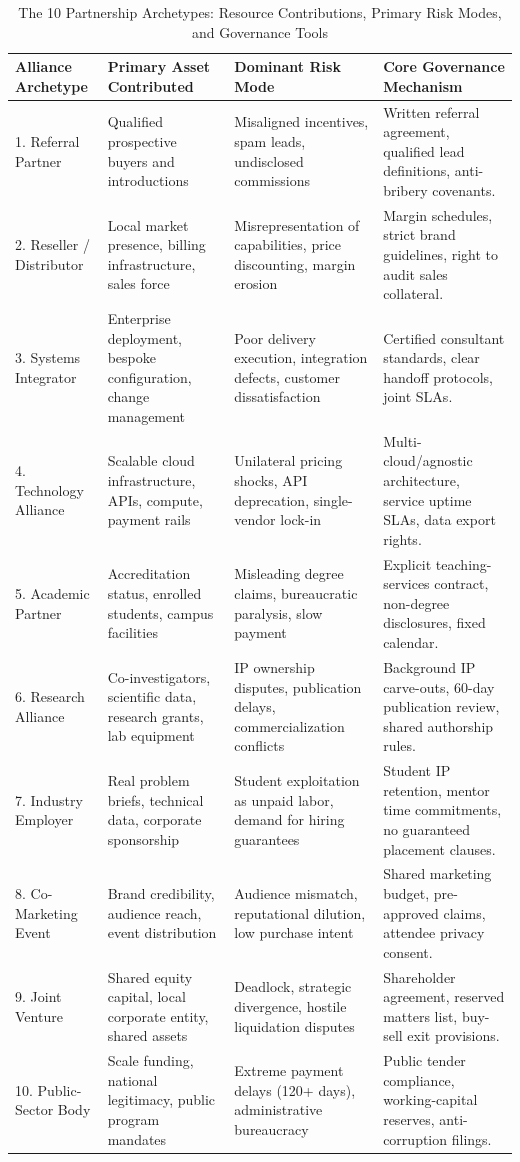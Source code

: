 \begin{table}[t]
\centering
\small
\caption{The 10 Partnership Archetypes: Resource Contributions, Primary Risk Modes, and Governance Tools}
\label{tab:ten_partnership_archetypes}
\begin{tabularx}{\textwidth}{p{2.6cm} p{3.2cm} p{3.4cm} X}
\toprule
\textbf{Alliance Archetype} & \textbf{Primary Asset Contributed} & \textbf{Dominant Risk Mode} & \textbf{Core Governance Mechanism} \\
\midrule
1. Referral Partner & Qualified prospective buyers and introductions & Misaligned incentives, spam leads, undisclosed commissions & Written referral agreement, qualified lead definitions, anti-bribery covenants. \\
2. Reseller / Distributor & Local market presence, billing infrastructure, sales force & Misrepresentation of capabilities, price discounting, margin erosion & Margin schedules, strict brand guidelines, right to audit sales collateral. \\
3. Systems Integrator & Enterprise deployment, bespoke configuration, change management & Poor delivery execution, integration defects, customer dissatisfaction & Certified consultant standards, clear handoff protocols, joint SLAs. \\
4. Technology Alliance & Scalable cloud infrastructure, APIs, compute, payment rails & Unilateral pricing shocks, API deprecation, single-vendor lock-in & Multi-cloud/agnostic architecture, service uptime SLAs, data export rights. \\
5. Academic Partner & Accreditation status, enrolled students, campus facilities & Misleading degree claims, bureaucratic paralysis, slow payment & Explicit teaching-services contract, non-degree disclosures, fixed calendar. \\
6. Research Alliance & Co-investigators, scientific data, research grants, lab equipment & IP ownership disputes, publication delays, commercialization conflicts & Background IP carve-outs, 60-day publication review, shared authorship rules. \\
7. Industry Employer & Real problem briefs, technical data, corporate sponsorship & Student exploitation as unpaid labor, demand for hiring guarantees & Student IP retention, mentor time commitments, no guaranteed placement clauses. \\
8. Co-Marketing Event & Brand credibility, audience reach, event distribution & Audience mismatch, reputational dilution, low purchase intent & Shared marketing budget, pre-approved claims, attendee privacy consent. \\
9. Joint Venture & Shared equity capital, local corporate entity, shared assets & Deadlock, strategic divergence, hostile liquidation disputes & Shareholder agreement, reserved matters list, buy-sell exit provisions. \\
10. Public-Sector Body & Scale funding, national legitimacy, public program mandates & Extreme payment delays (120+ days), administrative bureaucracy & Public tender compliance, working-capital reserves, anti-corruption filings. \\
\bottomrule
\end{tabularx}
\end{table}

